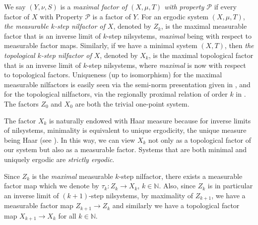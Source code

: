 \documentclass[12pt]{amsart}
\theoremstyle{definition}
\theoremstyle{plain}
\theoremstyle{definition}
\numberwithin{equation}{section}
\begin{document}
We say $(Y,\nu,S)$ is a \textit{maximal factor of $(X,\mu,T)$ with property $\mathcal{P}$} if every factor of $X$ with Property $\mathcal{P}$ is a factor of $Y$. For an ergodic system $(X, \mu, T)$, \textit{the measurable $k$-step nilfactor of $X$}, denoted by $Z_{k}$, is the maximal measurable factor that is an inverse limit of $k$-step nilsystems, \textit{maximal} being with respect to measurable factor maps. %
Similarly, if we have a minimal system $(X,T)$, then \textit{the topological $k$-step nilfactor of $X$}, denoted by $X_{k}$, is the maximal topological factor that is an inverse limit of $k$-step nilsystems, where \textit{maximal} is now with respect to topological factors. %
Uniqueness (up to isomorphism) for the maximal measurable nilfactors is easily seen via the semi-norm presentation given in \cite{HK paper}, and for the topological nilfactors, via the regionally proximal relation of order $k$ in \cite{Host Kra and Maass}. %
The factors $Z_0$ and $X_0$ are both the trivial one-point system. 



The factor $X_k$ is naturally endowed with Haar measure because for inverse limits of nilsystems, minimality is equivalent to unique ergodicity, the unique measure being Haar (see \cite{HK2}). In this way, we can view $X_k$ not only as a topological factor of our system but also as a measurable factor. Systems that are both minimal and uniquely ergodic are \textit{strictly ergodic}. 

Since $Z_k$ is the \textit{maximal} measurable $k$-step nilfactor, there exists a measurable factor map which we denote by $\tau_{k}\colon Z_k \rightarrow X_k$, $k\in \mathbb{N}$. Also, since $Z_k$ is in particular an inverse limit of $(k+1)$-step nilsystems, by maximality of $Z_{k+1}$, we have a measurable factor map $ Z_{k+1}\rightarrow Z_k$ and similarly we have a topological factor map $ X_{k+1} \rightarrow X_k$ for all $k\in \mathbb{N}$. 
\end{document}
